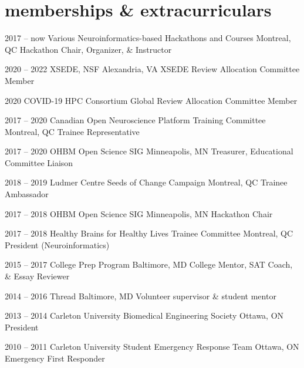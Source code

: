 \documentclass[]{friggeri-cv} %
\begin{document}
\section{memberships \& extracurriculars}

\begin{entrylist}
\entry
{2017 -- now}
{Various Neuroinformatics-based Hackathons and Courses}
{Montreal, QC}
{Hackathon Chair, Organizer, \& Instructor}

\entry
{2020 -- 2022}
{XSEDE, NSF}
{Alexandria, VA}
{XSEDE Review Allocation Committee Member}

\entry
{2020}
{COVID-19 HPC Consortium}
{Global}
{Review Allocation Committee Member}

\entry
{2017 -- 2020}
{Canadian Open Neuroscience Platform Training Committee}
{Montreal, QC}
{Trainee Representative}

\entry
{2017 -- 2020}
{OHBM Open Science SIG}
{Minneapolis, MN}
{Treasurer, Educational Committee Liaison}

\entry
{2018 -- 2019}
{Ludmer Centre Seeds of Change Campaign}
{Montreal, QC}
{Trainee Ambassador}

\entry
{2017 -- 2018}
{OHBM Open Science SIG}
{Minneapolis, MN}
{Hackathon Chair}

\entry
{2017 -- 2018}
{Healthy Brains for Healthy Lives Trainee Committee}
{Montreal, QC}
{President (Neuroinformatics)}

\entry
{2015 -- 2017}
{College Prep Program}
{Baltimore, MD}
{College Mentor, SAT Coach, \& Essay Reviewer}

\entry
{2014 -- 2016}
{Thread}
{Baltimore, MD}
{Volunteer supervisor \& student mentor}

\entry
{2013 -- 2014}
{Carleton University Biomedical Engineering Society}
{Ottawa, ON}
{President}

\entry
{2010 -- 2011}
{Carleton University Student Emergency Response Team}
{Ottawa, ON}
{Emergency First Responder}
\end{entrylist}

\end{document}
